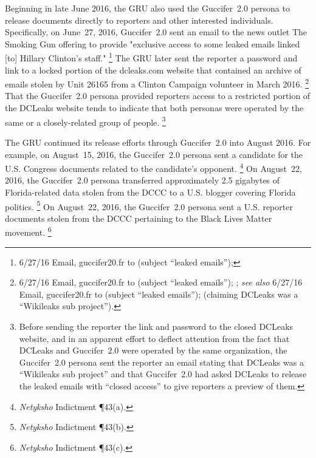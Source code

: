 Beginning in late June 2016, the GRU also used the Guccifer~2.0 persona to release documents directly to reporters and other interested individuals.
Specifically, on June~27, 2016, Guccifer~2.0 sent an email to the news outlet The Smoking Gun offering to provide "exclusive access to some leaked emails linked [to] Hillary Clinton's staff."%
\footnote{6/27/16 Email, guccifer20\@aol.fr to  (subject ``leaked emails''); }
The GRU later sent the reporter a password and link to a locked portion of the dcleaks.com website that contained an archive of emails stolen by Unit 26165 from a Clinton Campaign volunteer in March 2016.%
\footnote{6/27/16 Email, guccifer20\@aol.fr to  (subject ``leaked emails''); ;
\textit{see also} 6/27/16 Email, guccifer20\@aol.fr to  (subject ``leaked emails'');  (claiming DCLeaks was a “Wikileaks sub project”).}
That the Guccifer~2.0 persona provided reporters access to a restricted portion of the DCLeaks website tends to indicate that both personas were operated by the same or a  closely-related group of people.%
\footnote{Before sending the reporter the link and password to the closed DCLeaks website, and in an apparent effort to deflect attention from the fact that DCLeaks and Guccifer~2.0 were operated by the same organization, the Guccifer~2.0 persona sent the reporter an email stating that DCLeaks was a “Wikileaks sub project” and that Guccifer~2.0 had asked DCLeaks to release the leaked emails with “closed access” to give reporters a preview of them.
}

The GRU continued its release efforts through Guccifer~2.0 into August 2016.
For example, on August~15, 2016, the Guccifer~2.0 persona sent a candidate for the U.S. Congress documents related to the candidate's opponent.%
\footnote{\textit{Netyksho} Indictment \P 43(a).}
On August~22, 2016, the Guccifer~2.0 persona transferred approximately 2.5 gigabytes of Florida-related data stolen from the DCCC to a U.S. blogger covering Florida politics.%
\footnote{\textit{Netyksho} Indictment \P 43(b).}
On August~22, 2016, the Guccifer~2.0 persona sent a U.S. reporter documents stolen from the DCCC pertaining to the Black Lives Matter movement.%
\footnote{\textit{Netyksho} Indictment \P 43(c).}

